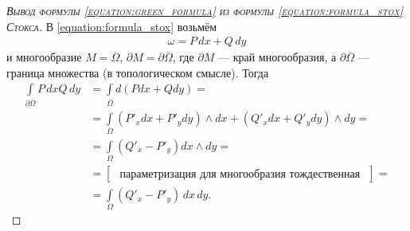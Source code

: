 \begin{proof}[\normalfont\textsc{Вывод формулы \eqref{equation:green_formula} из формулы \eqref{equation:formula_stox} Стокса}]
 В \eqref{equation:formula_stox} возьмём
 \begin{align*}
  \omega = P \, dx + Q \, dy
 \end{align*} и многообразие $M = \overline \Omega$, $\partial M = \partial \overline \Omega$, где $\partial M$ --- край многообразия, а $\partial \overline \Omega$ --- граница множества (в топологическом смысле). Тогда
 \begin{align*}
  \int\limits_{\partial \overline \Omega} P\,dx Q\,dy &= \int\limits_{\overline \Omega} d(Pdx+Qdy) = \\
  &= \int\limits_{\Omega} (P'_x dx + P'_y dy) \land dx + (Q'_x dx + Q'_y dy) \land dy = \\
  &= \int\limits_{\Omega} (Q'_x - P'_y) dx \land dy = \\
  &= \begin{bmatrix}
   \text{ параметризация для многообразия тождественная  } 
  \end{bmatrix} = \\
  &= \int\limits_{\Omega} (Q'_x - P'_y) \,dx\,dy
 .\end{align*} 
\end{proof}

